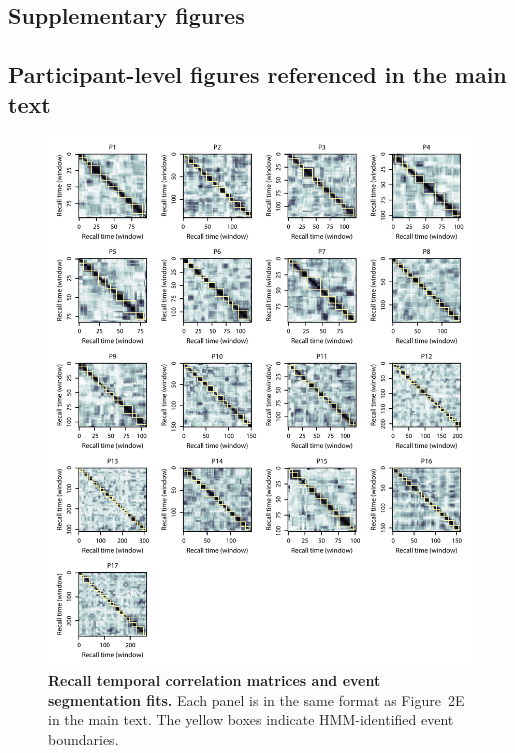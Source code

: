 \documentclass{article}
\newcommand{\topicprops}{2}
\begin{document}
\newpage
\begin{centering}
  \vspace*{\fill}
  \section*{Supplementary figures}
    \subsection*{Participant-level figures referenced in the main text}
    \vspace*{\fill}
  \end{centering}

\begin{figure}[p!]
\centering
\includegraphics[width=\textwidth]{figs/corrmats}
\caption{\small \textbf{Recall temporal correlation matrices and event segmentation fits.} Each panel is in the same format as Figure~\topicprops E in the main text.  The yellow boxes indicate HMM-identified event boundaries.}
\label{fig:corrmats}
\end{figure}
\end{document}
